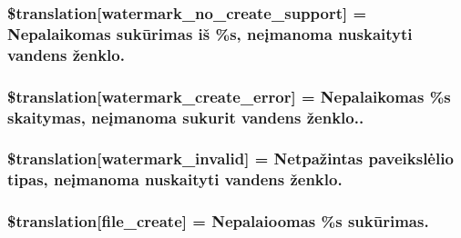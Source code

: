 \subsubsection[{\$translation}]{\setlength{\rightskip}{0pt plus 5cm}\$translation\mbox{[}\textquotesingle{}watermark\+\_\+no\+\_\+create\+\_\+support\textquotesingle{}\mbox{]} = \textquotesingle{}Nepalaikomas sukūrimas iš \%s, neįmanoma nuskaityti vandens ženklo.\textquotesingle{}}\label{class_8upload_8lt___l_t_8php_a82d5853430ab72dc1f9799ec36144cc6}
\hypertarget{class_8upload_8lt___l_t_8php_aabca0b65dadbc6184415c16375f284ca}{}
\subsubsection[{\$translation}]{\setlength{\rightskip}{0pt plus 5cm}\$translation\mbox{[}\textquotesingle{}watermark\+\_\+create\+\_\+error\textquotesingle{}\mbox{]} = \textquotesingle{}Nepalaikomas \%s skaitymas, neįmanoma sukurit vandens ženklo..\textquotesingle{}}\label{class_8upload_8lt___l_t_8php_aabca0b65dadbc6184415c16375f284ca}
\hypertarget{class_8upload_8lt___l_t_8php_ac336e7a5701e47ba4a05e9e498a3cc44}{}
\subsubsection[{\$translation}]{\setlength{\rightskip}{0pt plus 5cm}\$translation\mbox{[}\textquotesingle{}watermark\+\_\+invalid\textquotesingle{}\mbox{]} = \textquotesingle{}Netpažintas paveikslėlio tipas, neįmanoma nuskaityti vandens ženklo.\textquotesingle{}}\label{class_8upload_8lt___l_t_8php_ac336e7a5701e47ba4a05e9e498a3cc44}
\hypertarget{class_8upload_8lt___l_t_8php_a1ecb4673e4fb69e06b3f20b65cecf30a}{}
\subsubsection[{\$translation}]{\setlength{\rightskip}{0pt plus 5cm}\$translation\mbox{[}\textquotesingle{}file\+\_\+create\textquotesingle{}\mbox{]} = \textquotesingle{}Nepalaioomas \%s sukūrimas.\textquotesingle{}}\label{class_8upload_8lt___l_t_8php_a1ecb4673e4fb69e06b3f20b65cecf30a}
\hypertarget{class_8upload_8lt___l_t_8php_a4712d7ec28e9a7f17eb3338af2358363}{}
